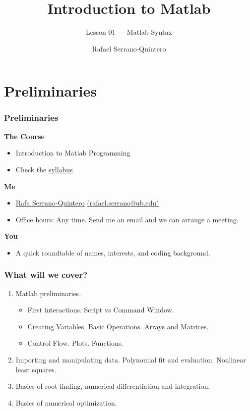\documentclass[11pt,xcolor={svgnames},aspectratio=169,usepdftitle=false,notheorems]{beamer}
\title{Introduction to Matlab}
\subtitle{Lesson 01 --- Matlab Syntax}
\author{Rafael Serrano-Quintero}
\institute{Department of Economics \\ University of Barcelona}
\date{}
\begin{document}
\VerbatimFootnotes

\maketitle

\section{Preliminaries}

\begin{frame}
    \frametitle{Preliminaries}
    \textbf{\alert{The Course}}
    \begin{itemize}
        \item Introduction to Matlab Programming
        \item Check the \href{run:../syllabus/syllabus.pdf}{syllabus}
    \end{itemize}
    \textbf{\alert{Me}}
    \begin{itemize}
        \item \href{rafserqui.github.io}{Rafa Serrano-Quintero} \href{mailto:rafael.serrano@ub.edu}{(rafael.serrano@ub.edu)}
        \item Office hours: Any time. Send me an email and we can arrange a meeting.
    \end{itemize}
    \textbf{\alert{You}}
    \begin{itemize}
        \item A quick roundtable of names, interests, and coding background.
    \end{itemize}
\end{frame}

\begin{frame}
    \frametitle{What will we cover?}
    \begin{enumerate}
        \item Matlab preliminaries. 
            \begin{itemize}
                \item First interactions. Script vs Command Window.
                \item Creating Variables. Basic Operations. Arrays and Matrices.
                \item Control Flow. Plots. Functions.
            \end{itemize}
        \item Importing and manipulating data. Polynomial fit and evaluation. Nonlinear least squares.
        \item Basics of root finding, numerical differentiation and integration.
        \item Basics of numerical optimization.
    \end{enumerate}
\end{frame}
\end{document}
